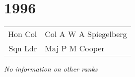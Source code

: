 \chapter*{1996}

\begin{center}
  \small
  \begin{tabular}{rl}
    Hon Col & Col A W A Spiegelberg \\
    Sqn Ldr & Maj P M Cooper \\
  \end{tabular}
\end{center}

\begin{center}
  \textit{No information on other ranks}
\end{center}

\vspace{50mm}

\pagebreak
